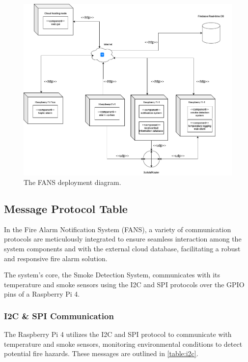 \begin{figure}
    \centering
    \includegraphics[width=\imagewidth]{../assets/FANSDeployment.png}
    \caption{The FANS deployment diagram.}
    \label{fig:deployment}
\end{figure}

\subsection{Message Protocol Table}

In the Fire Alarm Notification System (FANS), a variety of communication protocols are meticulously integrated to
ensure seamless interaction among the system components and with the external cloud database, facilitating a robust and
responsive fire alarm solution.

The system’s core, the Smoke Detection System, communicates with its temperature and smoke sensors using the I2C and
SPI protocols over the GPIO pins of a Raspberry Pi 4.

\subsubsection{I2C \& SPI Communication}

The Raspberry Pi 4 utilizes the I2C and SPI protocol to communicate with temperature and smoke sensors, monitoring
environmental conditions to detect potential fire hazards. These messages are outlined in \ref{table:i2c}.

